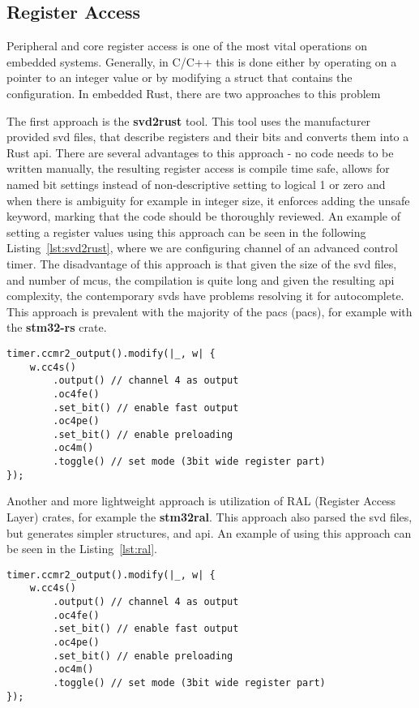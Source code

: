 \subsection{Register Access}
\label{subsec:register_access}
Peripheral and core register access is one of the most vital operations on embedded systems.
Generally, in C/C++ this is done either by operating on a pointer to an integer value or by modifying a struct that contains the configuration.
In embedded Rust, there are two approaches to this problem

The first approach is the \textbf{svd2rust}\cite{rust_embedded_devices_wg_rust-embeddedsvd2rust_2021} tool.
This tool uses the manufacturer provided \acs{svd} files, that describe registers and their bits and converts them into a Rust \acs{api}.
There are several advantages to this approach - no code needs to be written manually, the resulting register access is compile time safe, allows for named bit settings instead of non-descriptive setting to logical 1 or zero and when there is ambiguity for example in integer size, it enforces adding the unsafe keyword, marking that the code should be thoroughly reviewed.
An example of setting a register values using this approach can be seen in the following Listing~\ref{lst:svd2rust}, where we are configuring channel of an advanced control timer.
The disadvantage of this approach is that given the size of the \acs{svd} files, and number of \acs{mcu}s, the compilation is quite long and given the resulting \acs{api} complexity, the contemporary \acs{svd}s have problems resolving it for autocomplete.
This approach is prevalent with the majority of the \acs{pac}s (\acl{pac}s), for example with the \textbf{stm32-rs} crate\cite{noauthor_stm32-rsstm32-rs_2021}.

\begin{lstlisting}[caption={Using svd2rust generated API for register access.},label=lst:svd2rust]
timer.ccmr2_output().modify(|_, w| {
    w.cc4s()
        .output() // channel 4 as output
        .oc4fe()
        .set_bit() // enable fast output
        .oc4pe()
        .set_bit() // enable preloading
        .oc4m()
        .toggle() // set mode (3bit wide register part)
});
\end{lstlisting}

Another and more lightweight approach is utilization of RAL (Register Access Layer) crates, for example the \textbf{stm32ral}\cite{stm32_ral}.
This approach also parsed the \acs{svd} files, but generates simpler structures, and \acs{api}.
An example of using this approach can be seen in the Listing~\ref{lst:ral}.
\begin{lstlisting}[caption={Using RAL API for register access\cite{stm32-ral}.},label=lst:ral]
timer.ccmr2_output().modify(|_, w| {
    w.cc4s()
        .output() // channel 4 as output
        .oc4fe()
        .set_bit() // enable fast output
        .oc4pe()
        .set_bit() // enable preloading
        .oc4m()
        .toggle() // set mode (3bit wide register part)
});
\end{lstlisting}

